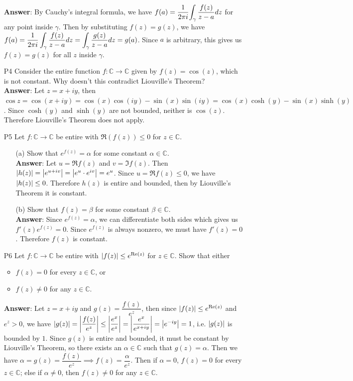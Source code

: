 \documentclass{article}
\begin{document}
\begin{itemize}
            \textbf{Answer}: By Cauchy's integral formula, we have $f(a)=\dfrac{1}{2\pi i}\mathlarger{\int_\gamma \dfrac{f(z)}{z-a}dz}$ for any point inside $\gamma$. Then by substituting $f(z)=g(z)$, we have $\mathlarger{f(a)=\dfrac{1}{2\pi i}\int_\gamma \dfrac{f(z)}{z-a}dz=\int_\gamma \dfrac{g(z)}{z-a}dz}=g(a)$. Since $a$ is arbitrary, this gives us $f(z)=g(z)$ for all $z$ inside $\gamma$.
      \item [P4] Consider the entire function $f:\mathbb{C}\rightarrow\mathbb{C}$ given by $f(z)=\cos(z)$, which is not constant. Why doesn't this contradict Liouville's Theorem?\\
            \textbf{Answer}: Let $z=x+iy$, then $\cos z=\cos(x+iy)=\cos(x)\cos(iy)-\sin(x)\sin(iy)=\cos(x)\cosh(y)-\sin(x)\sinh(y)$. Since $\cosh(y)$ and $\sinh(y)$ are not bounded, neither is $\cos(z)$. Therefore Liouville's Theorem does not apply.
      \item [P5] Let $f:\mathbb{C}\rightarrow\mathbb{C}$ be entire with $\Re(f(z))\leq 0$ for $z\in\mathbb{C}$.
            \begin{itemize}
                  \item [(a)] Show that $e^{f(z)}=\alpha$ for some constant $\alpha\in\mathbb{C}$.\\
                        \textbf{Answer}: Let $u=\Re f(z)$ and $v=\Im f(z)$. Then $\abs{h(z)}=\abs{e^{u+iv}}=\abs{e^u\cdot e^{iv}}=e^u$. Since $u=\Re f(z)\leq 0$, we have $\abs{h(z)}\leq 0$. Therefore $h(z)$ is entire and bounded, then by Liouville's Theorem it is constant.
                  \item [(b)] Show that $f(z)=\beta$ for some constant $\beta\in\mathbb{C}$.\\
                        \textbf{Answer}: Since $e^{f(z)}=\alpha$, we can differentiate both sides which gives us $f'(z)e^{f(z)}=0$. Since $e^{f(z)}$ is always nonzero, we must have $f'(z)=0$. Therefore $f(z)$ is constant.
            \end{itemize}
      \item [P6] Let $f:\mathbb{C}\rightarrow\mathbb{C}$ be entire with $\abs{f(z)}\leq e^{\Re(z)}$ for $z\in\mathbb{C}$. Show that either
            \begin{itemize}
                  \item $f(z)=0$ for every $z\in\mathbb{C}$, or
                  \item $f(z)\neq 0$ for any $z\in\mathbb{C}$.
            \end{itemize}
            \textbf{Answer}: Let $z=x+iy$ and $g(z)=\dfrac{f(z)}{e^z}$, then since $\abs{f(z)}\leq e^{\Re(z)}$ and $e^z>0$, we have $\abs{g(z)}=\abs{\dfrac{f(z)}{e^z}}\leq\abs{\dfrac{e^x}{e^z}}=\abs{\dfrac{e^x}{e^{x+iy}}}=\abs{e^{-iy}}=1$, i.e. $\abs{g(z)}$ is bounded by $1$. Since $g(z)$ is entire and bounded, it must be constant by Liouville's Theorem, so there exists an $\alpha\in\mathbb{C}$ such that $g(z)=\alpha$. Then we have $\alpha=g(z)=\dfrac{f(z)}{e^z}\implies f(z)=\dfrac{\alpha}{e^z}$. Then if $\alpha=0$, $f(z)=0$ for every $z\in\mathbb{C}$; else if $\alpha\neq 0$, then $f(z)\neq 0$ for any $z\in\mathbb{C}$.
\end{itemize}
\end{document}
